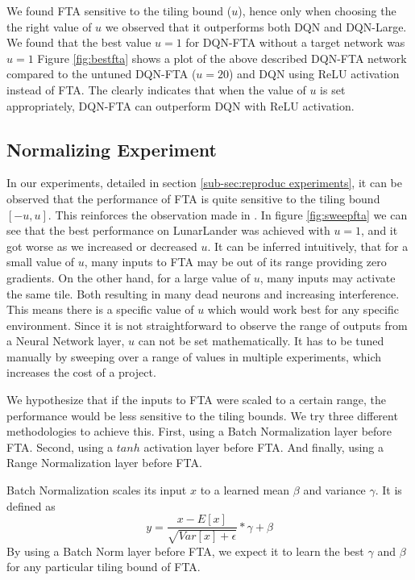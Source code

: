 \documentclass{article}
\begin{document}
We found FTA sensitive to the tiling bound ($u$), hence only when choosing the the right value of $u$ we observed that it outperforms both DQN and DQN-Large.
We found that the best value $u=1$ for DQN-FTA without a target network was $u=1$
Figure \ref{fig:bestfta} shows a plot of the above described DQN-FTA network compared to the untuned DQN-FTA ($u=20$) and DQN using ReLU activation instead of FTA.
The clearly indicates that when the value of $u$ is set appropriately, DQN-FTA can outperform DQN with ReLU activation.


\subsection{Normalizing Experiment} \label{sub-sec:normalize experiments}
In our experiments, detailed in section \ref{sub-sec:reproduc experiments}, it can be observed that the performance of FTA is quite sensitive to the tiling bound $[-u, u]$.
This reinforces the observation made in \cite{pan2019fuzzy}.
In figure \ref{fig:sweepfta} we can see that the best performance on LunarLander was achieved with $u=1$, and it got worse as we increased or decreased $u$.
It can be inferred intuitively, that for a small value of $u$, many inputs to FTA may be out of its range providing zero gradients.
On the other hand, for a large value of $u$, many inputs may activate the same tile.
Both resulting in many dead neurons and increasing interference.
This means there is a specific value of $u$ which would work best for any specific environment.
Since it is not straightforward to observe the range of outputs from a Neural Network layer, $u$ can not be set mathematically.
It has to be tuned manually by sweeping over a range of values in multiple experiments, which increases the cost of a project.

We hypothesize that if the inputs to FTA were scaled to a certain range, the performance would be less sensitive to the tiling bounds.
We try three different methodologies to achieve this.
First, using a Batch Normalization \cite[]{ioffe2015batch} layer before FTA.
Second, using a $tanh$ activation layer before FTA.
And finally, using a Range Normalization layer before FTA.

Batch Normalization scales its input $x$ to a learned mean $\beta$ and variance $\gamma$.
It is defined as
\begin{equation}
    y = \frac{x-E[x]}{\sqrt{Var[x] + \epsilon}} * \gamma + \beta
    \label{eq:batchnorm}
\end{equation}
By using a Batch Norm layer before FTA, we expect it to learn the best $\gamma$ and $\beta$ for any particular tiling bound of FTA.
\end{document}
